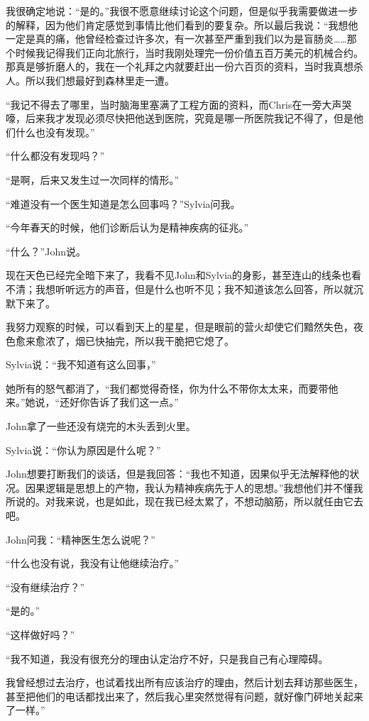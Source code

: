 \documentclass[UTF8]{article}
\begin{document}
\par 我很确定地说：“是的。”我很不愿意继续讨论这个问题，但是似乎我需要做进一步的解释，因为他们肯定感觉到事情比他们看到的要复杂。所以最后我说：“我想他一定是真的痛，他曾经检查过许多次，有一次甚至严重到我们以为是盲肠炎……那个时候我记得我们正向北旅行，当时我刚处理完一份价值五百万美元的机械合约。那真是够折磨人的，我在一个礼拜之内就要赶出一份六百页的资料，当时我真想杀人。所以我们想最好到森林里走一遭。
\par “我记不得去了哪里，当时脑海里塞满了工程方面的资料，而Chris在一旁大声哭嚎，后来我才发现必须尽快把他送到医院，究竟是哪一所医院我记不得了，但是他们什么也没有发现。”
\par “什么都没有发现吗？”
\par “是啊，后来又发生过一次同样的情形。”
\par “难道没有一个医生知道是怎么回事吗？”Sylvia问我。
\par “今年春天的时候，他们诊断后认为是精神疾病的征兆。”
\par “什么？”John说。
\par 现在天色已经完全暗下来了，我看不见John和Sylvia的身影，甚至连山的线条也看不清；我想听听远方的声音，但是什么也听不见；我不知道该怎么回答，所以就沉默下来了。
\par 我努力观察的时候，可以看到天上的星星，但是眼前的营火却使它们黯然失色，夜色愈来愈浓了，烟已快抽完，所以我干脆把它熄了。
\par Sylvia说：“我不知道有这么回事，”
\par 她所有的怒气都消了，“我们都觉得奇怪，你为什么不带你太太来，而要带他来。”她说，“还好你告诉了我们这一点。”
\par John拿了一些还没有烧完的木头丢到火里。
\par Sylvia说：“你认为原因是什么呢？”
\par John想要打断我们的谈话，但是我回答：“我也不知道，因果似乎无法解释他的状况。因果逻辑是思想上的产物，我认为精神疾病先于人的思想。”我想他们并不懂我所说的。对我来说，也是如此，现在我已经太累了，不想动脑筋，所以就任由它去吧。
\par John问我：“精神医生怎么说呢？”
\par “什么也没有说，我没有让他继续治疗。”
\par “没有继续治疗？”
\par “是的。”
\par “这样做好吗？”
\par “我不知道，我没有很充分的理由认定治疗不好，只是我自己有心理障碍。
\par 我曾经想过去治疗，也试着找出所有应该治疗的理由，然后计划去拜访那些医生，甚至把他们的电话都找出来了，然后我心里突然觉得有问题，就好像门砰地关起来了一样。”
\end{document}
